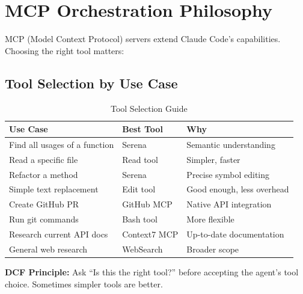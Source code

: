 \chapter{MCP Orchestration Philosophy}

MCP (Model Context Protocol) servers extend Claude Code's capabilities. Choosing the right tool matters:

\section{Tool Selection by Use Case}

\begin{table}[H]
\centering
\begin{tabular}{lll}
\toprule
\textbf{Use Case} & \textbf{Best Tool} & \textbf{Why} \\
\midrule
Find all usages of a function & Serena & Semantic understanding \\
Read a specific file & Read tool & Simpler, faster \\
Refactor a method & Serena & Precise symbol editing \\
Simple text replacement & Edit tool & Good enough, less overhead \\
Create GitHub PR & GitHub MCP & Native API integration \\
Run git commands & Bash tool & More flexible \\
Research current API docs & Context7 MCP & Up-to-date documentation \\
General web research & WebSearch & Broader scope \\
\bottomrule
\end{tabular}
\caption{Tool Selection Guide}
\end{table}

\textbf{DCF Principle:} Ask ``Is this the right tool?'' before accepting the agent's tool choice. Sometimes simpler tools are better.

